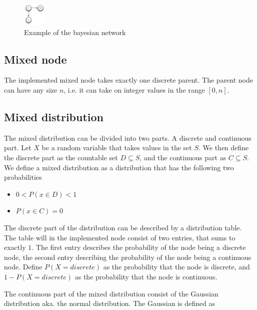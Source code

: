 \documentclass[10pt, journal, compsocconf,a4paper]{IEEEtran}
\begin{document}
\begin{figure}[ht]
\centering
\includegraphics[width=0.1\textwidth]{figures/fig2.pdf}
\caption{Example of the bayesian network}
\label{fig2}
\end{figure}

\subsection{Mixed node} %
\label{sub:mixed_node}
The implemented mixed node takes exactly one discrete parent. The parent node can have any size $n$, i.e. it can take on integer values in the range $[0,n]$.


\subsection{Mixed distribution} %
\label{sub:mixed_distribution}
The mixed distribution can be divided into two parts. A discrete and continuous part. Let $X$ be a random variable that takes values in the set $S$. We then define the discrete part as the countable set $D \subseteq S$, and the continuous part as $C \subseteq S$. We define a mixed distribution as a distribution that has the following two probabilities

\begin{center}
  \begin{itemize}
    \item $0 < P(x \in D) < 1$
    \item $P(x \in C) = 0$
  \end{itemize} 
  
\end{center}

The discrete part of the distribution can be described by a distribution table. The table will in the implemented node consist of two entries, that sums to exactly $1$. The first entry describes the probability of the node being a discrete node, the second entry describing the probability of the node being a continuous node. Define $P(X = discrete)$ as the probability that the node is discrete, and $1-P(X = discrete)$ as the probability that the node is continuous. 

The continuous part of the mixed distribution consist of the Gaussian distribution aka. the normal distribution. The Gaussian is defined as
\end{document}
